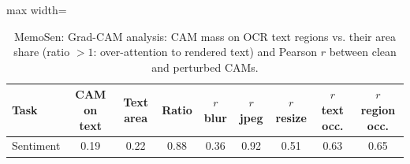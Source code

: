 \begin{table}[t]
\centering
\small
\caption{MemoSen: Grad-CAM analysis: CAM mass on OCR text regions vs. their area share (ratio $>1$: over-attention to rendered text) and Pearson $r$ between clean and perturbed CAMs.}
\label{tab:gradcam_memosen}
\begin{adjustbox}{max width=\columnwidth}
\begin{tabular}{lcccccccc}
\toprule
Task & CAM on text & Text area & Ratio & $r$ blur & $r$ jpeg & $r$ resize & $r$ text occ. & $r$ region occ. \\
\midrule
Sentiment & 0.19 & 0.22 & 0.88 & 0.36 & 0.92 & 0.51 & 0.63 & 0.65 \\
\bottomrule
\end{tabular}
\end{adjustbox}
\end{table}
